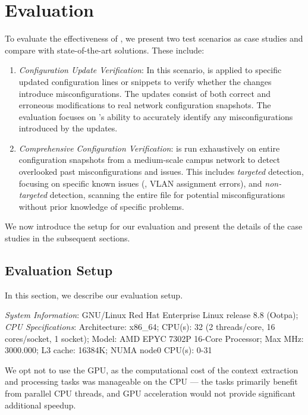 \section{Evaluation}
\label{sec:eval}
To evaluate the effectiveness of \sysname{}, we present two test scenarios as case studies and compare \sysname{} with state-of-the-art solutions. These include:

\begin{enumerate}
    \item \textit{Configuration Update Verification}: In this scenario, \sysname{} is applied to specific updated configuration lines or snippets to verify whether the changes introduce misconfigurations. The updates consist of both correct and erroneous modifications to real network configuration snapshots. The evaluation focuses on \sysname{}’s ability to accurately identify any misconfigurations introduced by the updates.
    \item \textit{Comprehensive Configuration Verification}: \sysname{} is run exhaustively on entire configuration snapshots from a medium-scale campus network to detect overlooked past misconfigurations and issues. This includes \textit{targeted} detection, focusing on specific known issues (\eg, VLAN assignment errors), and \textit{non-targeted} detection, scanning the entire file for potential misconfigurations without prior knowledge of specific problems.
\end{enumerate}

We now introduce the setup for our evaluation and present the details of the case studies in the subsequent sections.


\subsection{Evaluation Setup}

In this section, we describe our evaluation setup.

\textit{System Information}: GNU/Linux Red Hat Enterprise Linux release 8.8 (Ootpa); 
\textit{CPU Specifications}: Architecture: x86\_64; CPU(s): 32 (2 threads/core, 16 cores/socket, 1 socket); Model: AMD EPYC 7302P 16-Core Processor; Max MHz: 3000.000; L3 cache: 16384K; NUMA node0 CPU(s): 0-31 

We opt not to use the GPU, as the computational cost of the context extraction and processing tasks was manageable on the CPU --- the tasks primarily benefit from parallel CPU threads, and GPU acceleration would not provide significant additional speedup.


